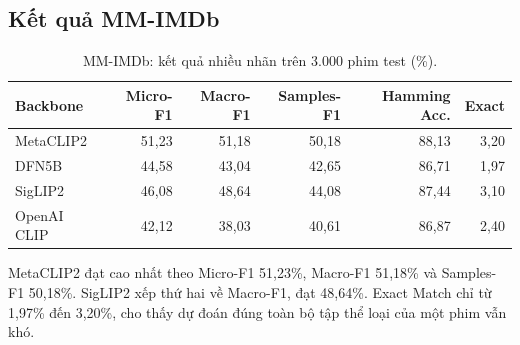 \documentclass[12pt,a4paper]{article}
\begin{document}
\subsection{Kết quả MM-IMDb}
\begin{table}[H]\centering\small
\caption{MM-IMDb: kết quả nhiều nhãn trên 3.000 phim test (\%).}\label{tab:mm-results}
\begin{tabular}{lrrrrr}\toprule
\textbf{Backbone}&\textbf{Micro-F1}&\textbf{Macro-F1}&\textbf{Samples-F1}&\textbf{Hamming Acc.}&\textbf{Exact}\\\midrule
MetaCLIP2&51,23&51,18&50,18&88,13&3,20\\
DFN5B&44,58&43,04&42,65&86,71&1,97\\
SigLIP2&46,08&48,64&44,08&87,44&3,10\\
OpenAI CLIP&42,12&38,03&40,61&86,87&2,40\\
\bottomrule\end{tabular}\end{table}

MetaCLIP2 đạt cao nhất theo Micro-F1 51,23\%, Macro-F1 51,18\% và Samples-F1 50,18\%. SigLIP2 xếp thứ hai về Macro-F1, đạt 48,64\%. Exact Match chỉ từ 1,97\% đến 3,20\%, cho thấy dự đoán đúng toàn bộ tập thể loại của một phim vẫn khó.
\end{document}
